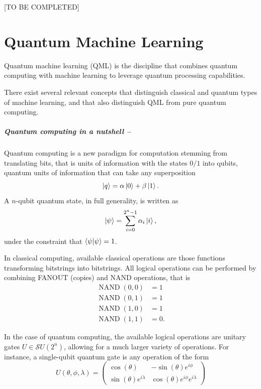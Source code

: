 \documentclass[]{report}
\begin{document}
 [TO BE COMPLETED]


\chapter{Quantum Machine Learning}

Quantum machine learning (QML) is the discipline that combines quantum computing with machine learning to leverage quantum processing capabilities. 

There exist several relevant concepts that distinguish classical and quantum types of machine learning, and that also distinguish QML from pure quantum computing. 

\paragraph{Quantum computing in a nutshell --} Quantum computing is a new paradigm for computation stemming from translating bits, that is units of information with the states $0 / 1$ into qubits, quantum units of information that can take any superposition 
\begin{equation}
\ket q = \alpha\ket 0 + \beta\ket 1.
\end{equation}
A $n$-qubit quantum state, in full generality, is written as
\begin{equation}
\ket\psi = \sum_{i = 0}^{2^n - 1} \alpha_i \ket i, 
\end{equation}
under the constraint that $\braket{\psi}{\psi} = 1$. 

In classical computing, available classical operations are those functions transforming bitstrings into bitstrings. All logical operations can be performed by combining FANOUT (copies) and NAND operations, that is 
\begin{align}
\operatorname{NAND}(0, 0) & = 1 \\
\operatorname{NAND}(0, 1) & = 1 \\
\operatorname{NAND}(1, 0) & = 1 \\
\operatorname{NAND}(1, 1) & = 0 .
\end{align}

In the case of quantum computing, the available logical operations are unitary gates $U \in \mathcal SU(2^n)$, allowing for a much larger variety of operations. For instance, a single-qubit quantum gate is any operation of the form
\begin{equation}
U(\theta, \phi, \lambda) = \begin{pmatrix}
\cos(\theta) & -\sin(\theta) e^{i\phi} \\
\sin(\theta) e^{i\lambda} & \cos(\theta) e^{i\phi} e^{i\lambda}
\end{pmatrix}
\end{equation}
\end{document}

